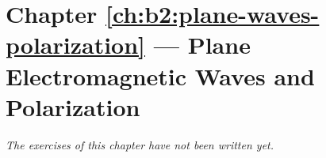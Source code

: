\section*{Chapter \ref{ch:b2:plane-waves-polarization} --- Plane Electromagnetic Waves and Polarization}


\emph{The exercises of this chapter have not been written yet.}
